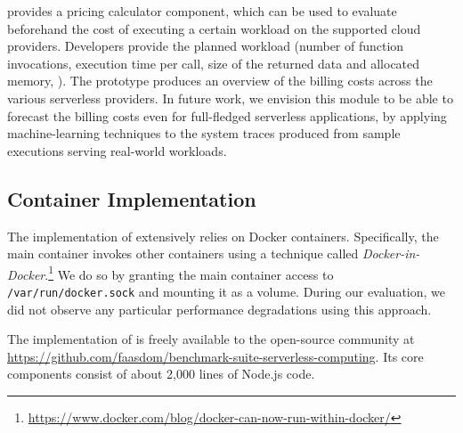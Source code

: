 \sys provides a pricing calculator component, which can be used to evaluate beforehand the cost of executing a certain workload on the supported cloud providers. 
Developers provide the planned workload (\eg number of function invocations, execution time per call, size of the returned data and allocated memory, \etc).
The \sys prototype produces an overview of the billing costs across the various serverless providers.
In future work, we envision this module to be able to forecast the billing costs even for full-fledged serverless applications, by applying machine-learning techniques to the system traces produced from sample executions serving real-world workloads.

\subsection{Container Implementation}
\label{ssec:impl}

The implementation of \sys extensively relies on Docker containers.
Specifically, the main container invokes other containers using a technique called \emph{Docker-in-Docker}.\footnote{\url{https://www.docker.com/blog/docker-can-now-run-within-docker/}}
We do so by granting the main container access to \texttt{/var/run/docker.sock} and mounting it as a volume.
During our evaluation, we did not observe any particular performance degradations using this approach.

The implementation of \sys is freely available to the open-source community at \url{https://github.com/faasdom/benchmark-suite-serverless-computing}.
Its core components consist of about 2,000 lines of Node.js code.